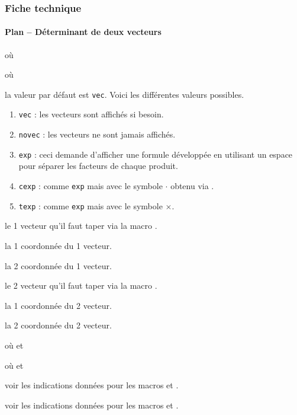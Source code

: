 \documentclass[12pt,a4paper]{article}
\begin{document}


\subsubsection{Fiche technique}

\paragraph{Plan -- Déterminant de deux vecteurs}

  où \quad {}

 où \quad {}


\IDoption{} la valeur par défaut est \verb+vec+. Voici les différentes valeurs possibles.
\begin{enumerate}
	\item \verb+vec+ : les vecteurs sont affichés si besoin.

	\item \verb+novec+ : les vecteurs ne sont jamais affichés.

	\item \verb+exp+ : ceci demande d'afficher une formule développée en utilisant un espace pour séparer les facteurs de chaque produit.

	\item \verb+cexp+ : comme \verb+exp+ mais avec le symbole $\cdot$ obtenu via .

	\item \verb+texp+ : comme \verb+exp+ mais avec le symbole $\times$.
\end{enumerate}


 le 1\ier{} vecteur qu'il faut taper via la macro .

 la 1\iere{} coordonnée du 1\ier{} vecteur.

 la 2\ieme{} coordonnée du 1\ier{} vecteur.

 le 2\ieme{} vecteur qu'il faut taper via la macro .

 la 1\iere{} coordonnée du 2\ieme{} vecteur.

 la 2\ieme{} coordonnée du 2\ieme{} vecteur.


\separation


  où \quad {}
                                      et 

 où \quad {}
                                      et 


\IDoption{} voir les indications données pour les macros  et .

 voir les indications données pour les macros  et .
\end{document}
